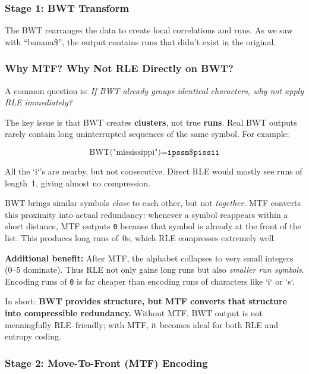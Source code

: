 \subsubsection{Stage 1: BWT Transform}

The BWT rearranges the data to create local correlations and runs. As we saw with ``banana\$'', the output contains runs that didn't exist in the original.

\subsubsection{Why MTF? Why Not RLE Directly on BWT?}

A common question is: \emph{If BWT already groups identical characters, why not apply RLE immediately?}

The key issue is that BWT creates \textbf{clusters}, not true \textbf{runs}. Real BWT outputs rarely contain long uninterrupted sequences of the same symbol. For example:

\[
\text{BWT("mississippi")} = \texttt{ipssm\$pissii}
\]

All the `i`'s are nearby, but not consecutive. Direct RLE would mostly see runs of length~1, giving almost no compression.

\begin{importantbox}
BWT brings similar symbols \emph{close} to each other, but not \emph{together}.  
MTF converts this proximity into actual redundancy: whenever a symbol reappears within a short distance, MTF outputs \texttt{0} because that symbol is already at the front of the list. This produces long runs of~0s, which RLE compresses extremely well.

\textbf{Additional benefit:} After MTF, the alphabet collapses to very small integers (0--5 dominate). Thus RLE not only gains long runs but also \emph{smaller run symbols}. Encoding runs of \texttt{0} is far cheaper than encoding runs of characters like `i` or `s`.
\end{importantbox}

In short: \textbf{BWT provides structure, but MTF converts that structure into compressible redundancy.} Without MTF, BWT output is not meaningfully RLE--friendly; with MTF, it becomes ideal for both RLE and entropy coding.

\subsubsection{Stage 2: Move-To-Front (MTF) Encoding}

